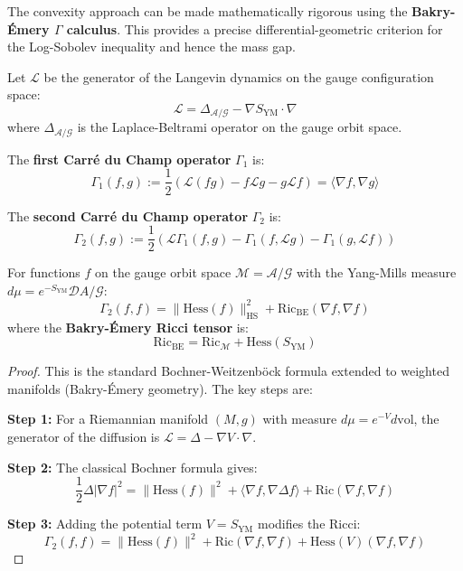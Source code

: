 The convexity approach can be made mathematically rigorous using the \textbf{Bakry-Émery 
$\Gamma$ calculus}. This provides a precise differential-geometric criterion 
for the Log-Sobolev inequality and hence the mass gap.

\begin{definition}
\label{def:carre-du-champ}
Let $\mathcal{L}$ be the generator of the Langevin dynamics on the gauge 
configuration space:
\[
\mathcal{L} = \Delta_{\mathcal{A}/\mathcal{G}} - \nabla S_{\text{YM}} \cdot \nabla
\]
where $\Delta_{\mathcal{A}/\mathcal{G}}$ is the Laplace-Beltrami operator on 
the gauge orbit space.

The \textbf{first Carré du Champ operator} $\Gamma_1$ is:
\[
\Gamma_1(f, g) := \frac{1}{2}\left(\mathcal{L}(fg) - f\mathcal{L}g - g\mathcal{L}f\right) 
= \langle \nabla f, \nabla g \rangle
\]

The \textbf{second Carré du Champ operator} $\Gamma_2$ is:
\[
\Gamma_2(f, g) := \frac{1}{2}\left(\mathcal{L}\Gamma_1(f,g) - \Gamma_1(f, \mathcal{L}g) 
- \Gamma_1(g, \mathcal{L}f)\right)
\]
\end{definition}

\begin{theorem}
\label{thm:bochner-gamma2}
For functions $f$ on the gauge orbit space $\mathcal{M} = \mathcal{A}/\mathcal{G}$ 
with the Yang-Mills measure $d\mu = e^{-S_{\text{YM}}} \mathcal{D}A/\mathcal{G}$:
\[
\Gamma_2(f, f) = \|\mathrm{Hess}(f)\|_{\mathrm{HS}}^2 + \mathrm{Ric}_{\text{BE}}(\nabla f, \nabla f)
\]
where the \textbf{Bakry-Émery Ricci tensor} is:
\[
\mathrm{Ric}_{\text{BE}} = \mathrm{Ric}_{\mathcal{M}} + \mathrm{Hess}(S_{\text{YM}})
\]
\end{theorem}

\begin{proof}
This is the standard Bochner-Weitzenböck formula extended to weighted manifolds 
(Bakry-Émery geometry). The key steps are:

\textbf{Step 1:} For a Riemannian manifold $(M, g)$ with measure $d\mu = e^{-V}d\mathrm{vol}$, 
the generator of the diffusion is $\mathcal{L} = \Delta - \nabla V \cdot \nabla$.

\textbf{Step 2:} The classical Bochner formula gives:
\[
\frac{1}{2}\Delta |\nabla f|^2 = \|\mathrm{Hess}(f)\|^2 + \langle \nabla f, \nabla \Delta f \rangle 
+ \mathrm{Ric}(\nabla f, \nabla f)
\]

\textbf{Step 3:} Adding the potential term $V = S_{\text{YM}}$ modifies the Ricci:
\[
\Gamma_2(f,f) = \|\mathrm{Hess}(f)\|^2 + \mathrm{Ric}(\nabla f, \nabla f) 
+ \mathrm{Hess}(V)(\nabla f, \nabla f)
\]
\end{proof}


